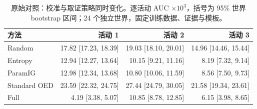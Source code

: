 \begin{table}[tbp]
\centering
\caption{原始对照：校准与取证策略同时变化。逐活动 AUC $\times10^3$，括号为 95\% 世界 bootstrap 区间；24 个独立世界，固定训练数据、证据与模板。}
\label{tab:acquisition_original}
\scriptsize
\setlength{\tabcolsep}{3pt}
\begin{tabular}{lrrr}
\toprule
方法 & 活动 1 & 活动 2 & 活动 3 \\
\midrule
Random & 17.82 [17.23, 18.39] & 19.03 [18.10, 20.01] & 14.96 [14.46, 15.44] \\
Entropy & 12.94 [12.27, 13.64] & 10.15 [9.21, 11.16] & 8.19 [7.32, 9.14] \\
ParamIG & 12.98 [12.34, 13.68] & 10.80 [10.06, 11.59] & 8.56 [7.50, 9.73] \\
Standard OED & 23.59 [22.32, 24.75] & 27.44 [24.79, 30.05] & 21.58 [19.34, 23.61] \\
Full & 4.19 [3.38, 5.07] & 10.85 [8.78, 12.85] & 6.15 [3.98, 8.65] \\
\bottomrule
\end{tabular}
\end{table}

